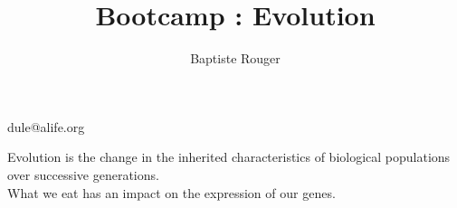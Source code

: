 \documentclass[10pt,a4paper]{article}
\author{Baptiste Rouger}
\title{Bootcamp : Evolution}
\begin{document}
\maketitle

\begin{flushright}
dule@alife.org
\end{flushright}

\tableofcontents

\newpage

Evolution is the change in the inherited characteristics of biological populations over successive generations.\\

What we eat has an impact on the expression of our genes.\\
\end{document}
